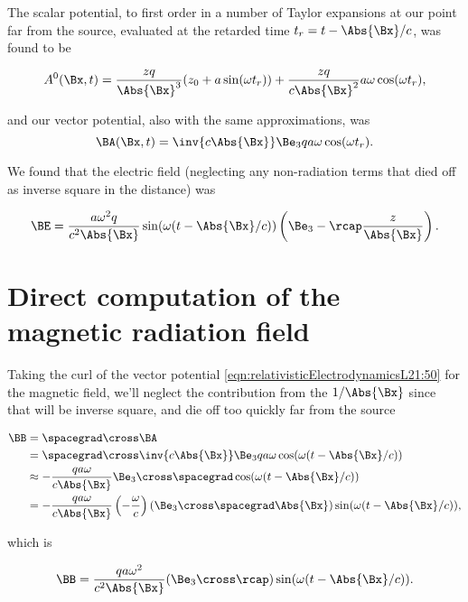 The scalar potential, to first order in a number of Taylor expansions at our point far from the source, evaluated at the retarded time $t_r = t - \Abs{\Bx}/c$, was found to be

\begin{equation}\label{eqn:relativisticElectrodynamicsL21:35}
A^0(\Bx, t) = \frac{z q}{\Abs{\Bx}^3} ( z_0 + a \sin(\omega t_r) ) + \frac{z q}{c \Abs{\Bx}^2} a \omega \cos(\omega t_r),
\end{equation}

and our vector potential, also with the same approximations, was
\begin{equation}\label{eqn:relativisticElectrodynamicsL21:40}
\BA(\Bx, t) = \inv{c \Abs{\Bx} } \Be_3 q a \omega \cos(\omega t_r).
\end{equation}

We found that the electric field (neglecting any non-radiation terms that died off as inverse square in the distance) was

\begin{equation}\label{eqn:relativisticElectrodynamicsL21:50}
\BE = \frac{a \omega^2 q}{c^2 \Abs{\Bx}} \sin( \omega (t - \Abs{\Bx}/c) ) \left( \Be_3 - \rcap \frac{z}{\Abs{\Bx}} \right).
\end{equation}

\section{Direct computation of the magnetic radiation field}

Taking the curl of the vector potential \ref{eqn:relativisticElectrodynamicsL21:50} for the magnetic field, we'll neglect the contribution from the $1/\Abs{\Bx}$ since that will be inverse square, and die off too quickly far from the source

\begin{align*}
\BB 
&= \spacegrad \cross \BA \\
&= \spacegrad \cross \inv{c \Abs{\Bx} } \Be_3 q a \omega \cos(\omega (t - \Abs{\Bx}/c)) \\
&\approx - \frac{q a \omega}{c \Abs{\Bx} } \Be_3 \cross \spacegrad \cos(\omega (t - \Abs{\Bx}/c)) \\
&= - \frac{q a \omega}{c \Abs{\Bx} } \left( -\frac{\omega}{c} \right) 
(\Be_3 \cross \spacegrad \Abs{\Bx}) \sin(\omega (t - \Abs{\Bx}/c)),
\end{align*}

which is

\begin{equation}\label{eqn:relativisticElectrodynamicsL21:n}
\BB = \frac{q a \omega^2}{c^2 \Abs{\Bx} } (\Be_3 \cross \rcap) \sin(\omega (t - \Abs{\Bx}/c)).
\end{equation}

